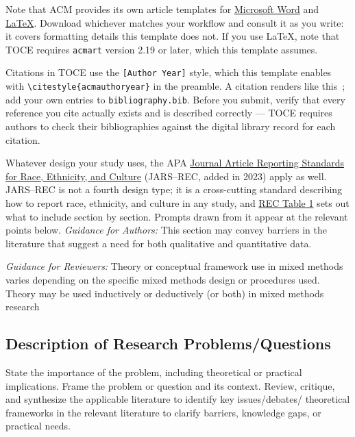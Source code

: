 \documentclass[acmsmall,screen,anonymous,review]{acmart}
\begin{document}
Note that ACM provides its own article templates for \href{https://www.acm.org/binaries/content/assets/publications/taps/acm_submission_template.docx}{Microsoft Word} and \href{https://portalparts.acm.org/hippo/latex_templates/acmart-primary.zip}{LaTeX}. Download whichever matches your workflow and consult it as you write: it covers formatting details this template does not. If you use LaTeX, note that TOCE requires \texttt{acmart} version 2.19 or later, which this template assumes.

Citations in TOCE use the \verb|[Author Year]| style, which this template enables with \verb|\citestyle{acmauthoryear}| in the preamble. A citation renders like this~\cite{Bak2017}; add your own entries to \texttt{bibliography.bib}. Before you submit, verify that every reference you cite actually exists and is described correctly --- TOCE requires authors to check their bibliographies against the digital library record for each citation.

Whatever design your study uses, the APA \href{https://apastyle.apa.org/jars/race-ethnicity-culture}{Journal Article Reporting Standards for Race, Ethnicity, and Culture} (JARS--REC, added in 2023) apply as well. JARS--REC is not a fourth design type; it is a cross-cutting standard describing how to report race, ethnicity, and culture in any study, and \href{https://apastyle.apa.org/jars/rec-table-1.pdf}{REC Table 1} sets out what to include section by section. Prompts drawn from it appear at the relevant points below.
\textit{Guidance for Authors:} This section may convey barriers in the literature that suggest a need for both qualitative and quantitative data.

\textit{Guidance for Reviewers:} Theory or conceptual framework use in mixed methods varies depending on the  specific mixed methods design or procedures used. Theory may be used inductively or deductively (or both) in mixed methods research

\subsection{Description of Research Problems/Questions}

State the importance of the problem, including theoretical or practical implications. Frame the problem or question and its context. Review, critique, and synthesize the applicable literature to identify key issues/debates/ theoretical frameworks in the relevant literature to clarify barriers, knowledge gaps, or practical needs. 
\end{document}
